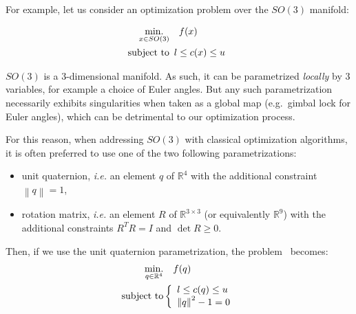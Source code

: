 For example, let us consider an optimization problem over the $SO(3)$ manifold:

\begin{align}
\label{eq:pb_on_SO3}
  \operatorname*{min.}_{x \in SO(3)} & \quad f(x)\\
  \text{subject to}&
  \begin{array}{lr}
    l \leq c(x) \leq u \nonumber
  \end{array}
\end{align}

$SO(3)$ is a 3-dimensional manifold.
As such, it can be parametrized \emph{locally} by $3$ variables, for example a choice of Euler angles. But any such parametrization necessarily exhibits singularities when taken as a global map (e.g.\ gimbal lock for Euler angles), which can be detrimental to our optimization process.

For this reason, when addressing $SO(3)$ with classical optimization algorithms, it is often preferred to use one of the two following parametrizations:
\begin{itemize}
    \item unit quaternion, \emph{i.e.} an element $q$ of $\mathbb{R}^4$ with the additional constraint $\left\|q\right\| = 1$,
    \item rotation matrix, \emph{i.e.} an element $R$ of $\mathbb{R}^{3 \times 3}$ (or equivalently $\mathbb{R}^9$) with the additional constraints $R^T R = I$ and $\det{R} \geq 0$.
\end{itemize}

Then, if we use the unit quaternion parametrization, the problem~ becomes:
\begin{align}
\label{eq:pb_on_SO3_quaternion}
  \operatorname*{min.}_{q \in \mathbb{R}^4} & \quad f(q)\\
  \text{subject to}&
  \left\{\begin{array}{lr}
    {l} \leq c(q) \leq {u} \nonumber\\
    {\|q\|}^2 - 1 = 0
  \end{array}\right.
\end{align}

